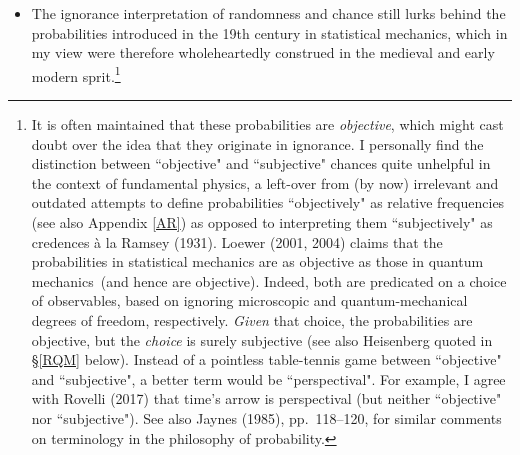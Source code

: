 \documentclass[11pt,a4paper]{article}
\numberwithin{equation}{section}
\newcommand{\qm}{quantum mechanics}
\begin{document}
\begin{itemize}
\begin{quote}
\end{quote}
Note that Leibniz' prophet appeals to the logical structure of the universe that makes it deterministic, whereas Laplace's intelligence  knows (Newtonian) physics.\footnote{However, van Strien (2014) argues that Laplace also falls back on Leibniz (and gets the physics wrong by not mentioning the momenta that the intelligence should know, too, besides the forces and positions).} In any case, it is important to note that Laplacian randomness is defined \emph{within a deterministic world},\footnote{Famously: `The world $W$ is Laplacian deterministic just in case for any physically possible world $W'$, if $W$ and $W'$  agree at any time, then they agree at all time.' (Earman, 1986, p. 13).} so that its 
antipode is not indeterminism but full knowledge (and computing power, etc.). Indeed, less well known than the above quotation is the following one, from the very same source:
\begin{quote}\begin{small}
All events, even those which on account of their insignificance do not seem to follow the great laws of nature, are a result of it just as necessarily as the revolutions of the sun.  (Laplace, 1814).\footnote{Quoted by Hacking (1990), p.\ 11.}
 \end{small}\end{quote}
\item The ignorance interpretation of randomness and chance still lurks behind  the probabilities introduced in the 19th century in statistical mechanics, which in my view were therefore  wholeheartedly construed in the medieval and early modern sprit.\footnote{ It is often maintained that these probabilities are \emph{objective},
 which might cast doubt over the idea that they originate in ignorance. I personally find the distinction between  ``objective"  and ``subjective" chances quite unhelpful in the context of fundamental physics, a left-over from (by now) irrelevant and outdated attempts to define probabilities ``objectively" as relative frequencies (see also Appendix \ref{AR}) as opposed to interpreting them ``subjectively" as credences \`{a} la Ramsey (1931).
 Loewer (2001, 2004) claims that the probabilities in statistical mechanics are as objective as those in \qm\ (and hence are objective). Indeed, both are predicated on a  choice of observables,  based on ignoring microscopic and quantum-mechanical degrees of freedom, respectively. \emph{Given} that choice, the probabilities are  objective, but the \emph{choice}  is surely subjective (see also Heisenberg quoted in \S\ref{RQM} below). Instead of a pointless table-tennis game between ``objective" and ``subjective",  a better term would be ``perspectival". For example, I agree with Rovelli (2017) that time's arrow is perspectival (but neither  ``objective" nor ``subjective"). See also Jaynes (1985),  pp.\ 118--120, for similar comments on  terminology in the philosophy of probability.
}
\end{itemize}
\end{document}

